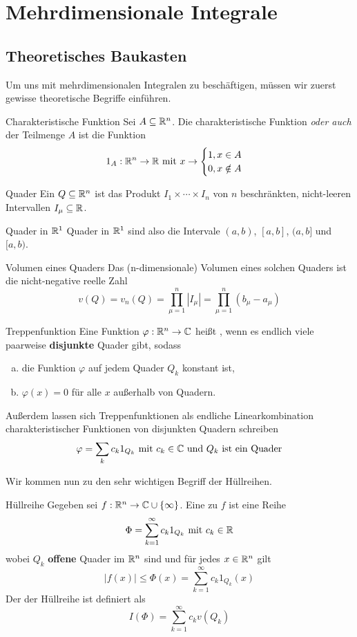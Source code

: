 \newpage
\newpage
\section[Einführung in die Gebietsintegrale]{Mehrdimensionale Integrale}
\subsection{Theoretisches Baukasten}
Um uns mit mehrdimensionalen Integralen zu beschäftigen, müssen wir zuerst gewisse theoretische Begriffe einführen.
\begin{Def}{Charakteristische Funktion}
Sei $A\subseteq \mathbb{R}^n$. Die charakteristische Funktion \textit{oder auch}  der Teilmenge $A$ ist die Funktion
$$1_A:\mathbb{R}^n \rightarrow \mathbb{R} \mbox{ mit } x\rightarrow \begin{cases}1, x\in A \\
0, x\notin A\end{cases}$$
\end{Def}
\begin{Def}{Quader}
Ein  $Q\subseteq \mathbb{R}^n$ ist das Produkt $I_1\times \cdots \times I_n$ von $n$ beschränkten, nicht-leeren Intervallen $I_\mu \subseteq \mathbb{R}$.
\end{Def}
\begin{Beispiel}{Quader in $\mathbb{R}^1$}
Quader in $\mathbb{R}^1$ sind also die Intervale $(a,b)$, $[a,b]$, $(a,b]$ und $[a,b)$. \\
\end{Beispiel}
\begin{Def}{Volumen eines Quaders}
Das (n-dimensionale) Volumen eines solchen Quaders ist die nicht-negative reelle Zahl
$$v(Q)=v_n(Q)=\prod_{\mu = 1}^n |I_\mu|=\prod_{\mu = 1}^n (b_\mu - a_\mu)$$
\end{Def}
\begin{Def}{Treppenfunktion}
Eine Funktion $\varphi:\mathbb{R}^n \rightarrow \mathbb{C}$ heißt , wenn es endlich viele paarweise \textbf{disjunkte} Quader gibt, sodass
\begin{enumerate}[a)]
    \item die Funktion $\varphi$ auf jedem Quader $Q_k$ konstant ist,
    \item $\varphi(x)=0$ für alle $x$ außerhalb von Quadern.
    \end{enumerate}
Außerdem lassen sich Treppenfunktionen als endliche Linearkombination charakteristischer Funktionen von disjunkten Quadern schreiben
$$\varphi=\sum_{k}c_k 1_{Q_k} \mbox{ mit $c_k\in \mathbb{C}$ und $Q_k$ ist ein Quader}$$ 
\end{Def}
Wir kommen nun zu den sehr wichtigen Begriff der Hüllreihen.
\begin{Def}{Hüllreihe}
Gegeben sei $f:\mathbb{R}^n\rightarrow\mathbb{C}\cup \{\infty\}$. Eine  zu $f$ ist eine Reihe
$$\Phi=\sum_{k=1}^\infty c_k1_{Q_k} \mbox{ mit $c_k\in \mathbb{R}$}$$
wobei $Q_k$ \textbf{offene} Quader im $\mathbb{R}^n$ sind und für jedes $x\in\mathbb{R}^n$ gilt
$$|f(x)|\leq \Phi(x) = \sum_{k=1}^\infty c_k1_{Q_k}(x)$$
Der  der Hüllreihe ist definiert als
$$I(\Phi) = \sum_{k=1}^\infty c_k v(Q_k)$$
\end{Def}

